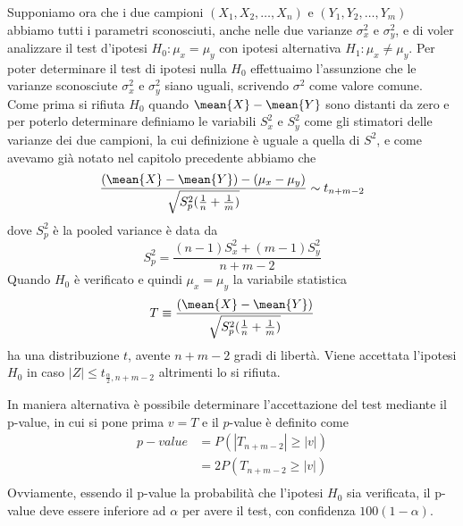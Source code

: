 Supponiamo ora che i due campioni $(X_1, X_2, \dots, X_n)$ e $(Y_1, Y_2, \dots, Y_m)$ abbiamo tutti i parametri
sconosciuti, anche nelle due varianze $\sigma_x^2$ e $\sigma_y^2$, e di voler analizzare il test d'ipotesi 
$H_0:\mu_x = \mu_y$ con ipotesi alternativa $H_1:\mu_x \neq \mu_y$.\newline
Per poter determinare il test di ipotesi nulla $H_0$ effettuaimo l'assunzione che le varianze sconosciute $\sigma_x^2$ 
e $\sigma_y^2$ siano uguali, scrivendo $\sigma^2$ come valore comune.\newline
Come prima si rifiuta $H_0$ quando $\mean{X} - \mean{Y}$ sono distanti da zero e per poterlo determinare definiamo 
le variabili $S_x^2$ e $S_y^2$ come gli stimatori delle varianze dei due campioni, la cui definizione è uguale a quella
di $S^2$, e come avevamo già notato nel capitolo precedente abbiamo che
\[ \frac{(\mean{X} - \mean{Y}) - (\mu_x - \mu_y)}{\sqrt{S^2_p(\frac{1}{n} + \frac{1}{m})}} \sim t_{n + m - 2} \]
dove $S_p^2$ è la pooled variance è data da 
\[ S_p^2 = \frac{(n-1)S^2_x + (m - 1)S^2_y}{n + m - 2} \]
Quando $H_0$ è verificato e quindi $\mu_x = \mu_y$ la variabile statistica 
\[ T \equiv \frac{(\mean{X} - \mean{Y})}{\sqrt{S^2_p(\frac{1}{n} + \frac{1}{m})}} \]
ha una distribuzione $t$, avente $n + m - 2$ gradi di libertà.\newline
Viene accettata l'ipotesi $H_0$ in caso $|Z| \leq t_{\frac{\alpha}{2}, n + m - 2}$ altrimenti lo si rifiuta.

In maniera alternativa è possibile determinare l'accettazione del test mediante il p-value, in cui si pone prima $v = T$
e il $p$-value è definito come
\[ \begin{split} 
    p-value & = P(|T_{n + m -2}| \geq |v|) \\
            & = 2P(T_{n + m -2} \geq |v|)\\
   \end{split} \]
Ovviamente, essendo il p-value la probabilità che l'ipotesi $H_0$ sia verificata, il p-value deve essere inferiore ad
$\alpha$ per avere il test, con confidenza $100(1 - \alpha)$.


